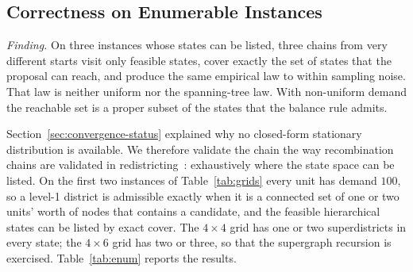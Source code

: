 \subsection{Correctness on Enumerable Instances}
\label{sec:exp-convergence}\label{sec:exp-enumeration}

\emph{Finding.} On three instances whose states can be listed, three chains from very different starts visit only feasible states, cover exactly the set of states that the proposal can reach, and produce the same empirical law to within sampling noise. That law is neither uniform nor the spanning-tree law. With non-uniform demand the reachable set is a proper subset of the states that the balance rule admits.

Section~\ref{sec:convergence-status} explained why no closed-form stationary distribution is available. We therefore validate the chain the way recombination chains are validated in redistricting~\citep{fifield2020essential,cannon2026spanning}: exhaustively where the state space can be listed. On the first two instances of Table~\ref{tab:grids} every unit has demand $100$, so a level-1 district is admissible exactly when it is a connected set of one or two units' worth of nodes that contains a candidate, and the feasible hierarchical states can be listed by exact cover. The $4\times4$ grid has one or two superdistricts in every state; the $4\times6$ grid has two or three, so that the supergraph recursion is exercised. Table~\ref{tab:enum} reports the results.

\begin{table}[!htbp]
\centering
\footnotesize\setlength{\tabcolsep}{3.5pt}
\resizebox{\linewidth}{!}{}
\caption{Exact enumeration. On the two grids with demand $100$ the feasible states are those that satisfy the rules of Section~\ref{sec:rules}; on the grid with demands $80$ to $120$ they are the states the proposal can reach, computed by closing its move rules, out of $3{,}087$ level-1 states that the balance rule admits. ``Unvisited'' is the number of feasible level-1 states that no chain visited, with the number an independent sample of the same total length from the pooled law would leave unvisited in parentheses. The total-variation (TV) distances are the largest over pairs of chains for the level-1 law and the joint (level-1, level-2) law, and the largest over chains between the two halves of one chain; each is followed in parentheses by its noise floor, the distance expected between two independent samples of the same size from the pooled law. The last three columns describe the pooled level-1 law: its distance to the uniform law and to the spanning-tree law, and the ratio of the largest to the smallest sampled frequency.}
\label{tab:enum}
\end{table}

